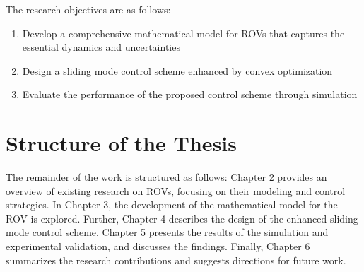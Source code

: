 The research objectives are as follows:
\begin{enumerate}
    \item Develop a comprehensive mathematical model for ROVs that captures the essential dynamics and uncertainties
    \item Design a sliding mode control scheme enhanced by convex optimization
    \item Evaluate the performance of the proposed control scheme through simulation
\end{enumerate}

\section{Structure of the Thesis}
    The remainder of the work is structured as follows:
    Chapter 2 provides an overview of existing research on ROVs, 
    focusing on their modeling and control strategies.
    In Chapter 3, the development of the 
    mathematical model for the ROV is explored.
    Further, Chapter 4 describes the design of the 
    enhanced sliding mode control scheme.
    Chapter 5 presents the results of the simulation and experimental 
    validation, and discusses the findings.
    Finally, Chapter 6 summarizes the research contributions and suggests directions for future work.
